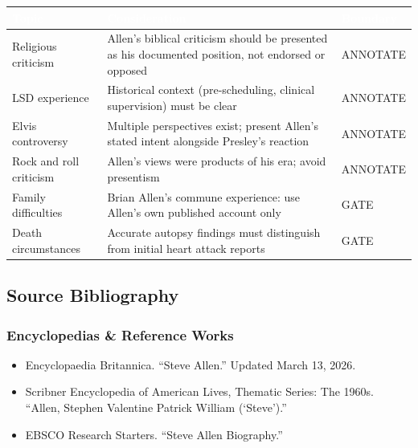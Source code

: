 \documentclass[11pt,letterpaper]{article}
\newcommand{\tableheader}[1]{\textbf{\sffamily\textcolor{white}{#1}}}
\begin{document}
\begin{center}
\begin{tabularx}{\textwidth}{L{3.5cm}XC{2.5cm}}
\toprule
{}
\tableheader{Topic} & \tableheader{Consideration} & \tableheader{Boundary} \\
\midrule
Religious criticism & Allen's biblical criticism should be presented as his documented position, not endorsed or opposed & ANNOTATE \\
LSD experience & Historical context (pre-scheduling, clinical supervision) must be clear & ANNOTATE \\
Elvis controversy & Multiple perspectives exist; present Allen's stated intent alongside Presley's reaction & ANNOTATE \\
Rock and roll criticism & Allen's views were products of his era; avoid presentism & ANNOTATE \\
Family difficulties & Brian Allen's commune experience: use Allen's own published account only & GATE \\
Death circumstances & Accurate autopsy findings must distinguish from initial heart attack reports & GATE \\
\bottomrule
\end{tabularx}
\end{center}

\subsection{Source Bibliography}

\subsubsection{Encyclopedias \& Reference Works}
\begin{itemize}[leftmargin=2em]
\item Encyclopaedia Britannica. ``Steve Allen.'' Updated March 13, 2026.
\item Scribner Encyclopedia of American Lives, Thematic Series: The 1960s. ``Allen, Stephen Valentine Patrick William (`Steve').''
\item EBSCO Research Starters. ``Steve Allen Biography.''
\end{itemize}
\end{document}
